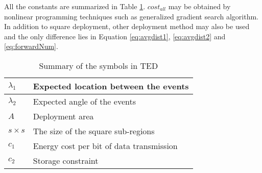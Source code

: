 All the constants are summarized in Table \ref{tab:ceduConstants}. \(cost_{all}\) may be obtained by nonlinear programming techniques such as generalized gradient search algorithm. In addition to square deployment, other deployment method may also be used and the only difference lies in Equation \ref{eq:avgdist1}, \ref{eq:avgdist2} and \ref{eq:forwardNum}.

\begin{table}
\begin{center}
\begin{tabular}{ | p{1cm} | p{5cm} | }
\hline
\({\lambda}_1\) & Expected location between the events \\ \hline
\({\lambda}_2\) & Expected angle of the events \\ \hline
\(A\) & Deployment area \\ \hline
\(s\times s\) & The size of the square sub-regions \\ \hline
\(c_1\) & Energy cost per bit of data transmission\\ \hline
\(c_2\) & Storage constraint\\ \hline
\end{tabular}
\end{center}
\caption{Summary of the symbols in TED}
\label{tab:ceduConstants}
\end{table}

